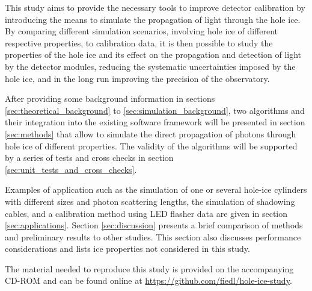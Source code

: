 This study aims to provide the necessary tools to improve detector calibration by introducing the means to simulate the propagation of light through the hole ice. By comparing different simulation scenarios, involving hole ice of different respective properties, to calibration data, it is then possible to study the properties of the hole ice and its effect on the propagation and detection of light by the detector modules, reducing the systematic uncertainties imposed by the hole ice, and in the long run improving the precision of the \icecube observatory.

After providing some background information in sections \ref{sec:theoretical_background} to \ref{sec:simulation_background}, two algorithms and their integration into the existing \icecube software framework will be presented in section \ref{sec:methods} that allow to simulate the direct propagation of photons through hole ice of different properties. The validity of the algorithms will be supported by a series of tests and cross checks in section \ref{sec:unit_tests_and_cross_checks}.

Examples of application such as the simulation of one or several hole-ice cylinders with different sizes and photon scattering lengths, the simulation of shadowing cables, and a calibration method using LED flasher data are given in section \ref{sec:applications}. Section \ref{sec:discussion} presents a brief comparison of methods and preliminary results to other studies. This section also discusses performance considerations and lists ice properties not considered in this study.

The material needed to reproduce this study is provided on the accompanying CD-ROM and can be found online at \url{https://github.com/fiedl/hole-ice-study}.

